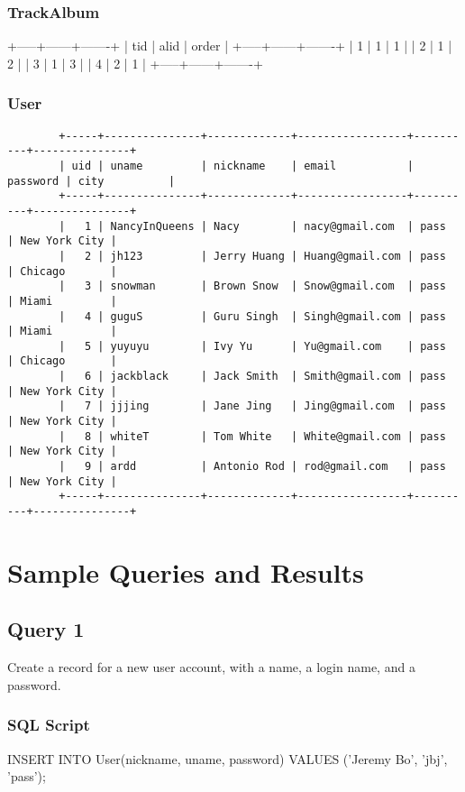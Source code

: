 \documentclass[letterpaper, 12pt]{report}
\begin{document}
	\subsubsection{TrackAlbum}
	\begin{spverbatim}
		+-----+------+-------+
		| tid | alid | order |
		+-----+------+-------+
		|   1 |    1 |     1 |
		|   2 |    1 |     2 |
		|   3 |    1 |     3 |
		|   4 |    2 |     1 |
		+-----+------+-------+
	\end{spverbatim}

	\subsubsection{User}
	\begin{verbatim}
		+-----+---------------+-------------+-----------------+----------+---------------+
		| uid | uname         | nickname    | email           | password | city          |
		+-----+---------------+-------------+-----------------+----------+---------------+
		|   1 | NancyInQueens | Nacy        | nacy@gmail.com  | pass     | New York City |
		|   2 | jh123         | Jerry Huang | Huang@gmail.com | pass     | Chicago       |
		|   3 | snowman       | Brown Snow  | Snow@gmail.com  | pass     | Miami         |
		|   4 | guguS         | Guru Singh  | Singh@gmail.com | pass     | Miami         |
		|   5 | yuyuyu        | Ivy Yu      | Yu@gmail.com    | pass     | Chicago       |
		|   6 | jackblack     | Jack Smith  | Smith@gmail.com | pass     | New York City |
		|   7 | jjjing        | Jane Jing   | Jing@gmail.com  | pass     | New York City |
		|   8 | whiteT        | Tom White   | White@gmail.com | pass     | New York City |
		|   9 | ardd          | Antonio Rod | rod@gmail.com   | pass     | New York City |
		+-----+---------------+-------------+-----------------+----------+---------------+
	\end{verbatim}
	
	\section{Sample Queries and Results}
	\subsection{Query 1}
	Create a record for a new user account, with a name, a login name, and a password.
	\subsubsection{SQL Script}
	\begin{spverbatim}
		INSERT INTO User(nickname, uname, password) VALUES ('Jeremy Bo', 'jbj', 'pass');
	\end{spverbatim}
\end{document}
